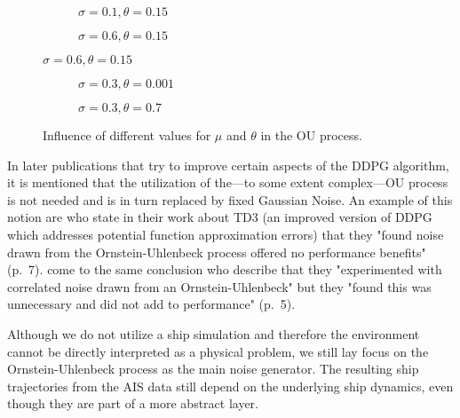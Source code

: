 \begin{figure}[H]
    \begin{subfigure}{0.495\textwidth}
      \centering
        
      \caption{$\sigma = 0.1, \theta = 0.15$}
      \label{fig:lowSigmaNoise}
    \end{subfigure}
    \begin{subfigure}{0.495\textwidth}
      \centering
        
      \caption{$\sigma = 0.6, \theta = 0.15$}
      \label{fig:highSigmaNoise}
    \end{subfigure}
\end{figure}
\begin{figure}[H]\ContinuedFloat
    \begin{subfigure}{0.495\textwidth}
      \centering
        
      \caption{$\sigma = 0.3, \theta = 0.001$}
    \end{subfigure}
    \begin{subfigure}{0.495\textwidth}
      \centering
        
      \caption{$\sigma = 0.3, \theta = 0.7$}
    \end{subfigure}
\caption{Influence of different values for $\mu$ and $\theta$ in the OU process.}
\label{fig:ouProcess}
\end{figure}

\par
In later publications that try to improve certain aspects of the DDPG algorithm, it is mentioned that the utilization of the—to some extent complex—OU process is not needed and is in turn replaced by fixed Gaussian Noise. An example of this notion are \cite{fujimoto2018addressing} who state in their work about TD3 (an improved version of DDPG which addresses potential function approximation errors) that they "found noise drawn from the Ornstein-Uhlenbeck process offered no performance benefits" (p.~7). \cite{barth2018distributed} come to the same conclusion who describe that they "experimented with correlated noise drawn from an Ornstein-Uhlenbeck" but they "found this was unnecessary and did
not add to performance" (p.~5).
\par
Although we do not utilize a ship simulation and therefore the environment cannot be directly interpreted as a physical problem, we still lay focus on the Ornstein-Uhlenbeck process as the main noise generator. The resulting ship trajectories from the AIS data still depend on the underlying ship dynamics, even though they are part of a more abstract layer.